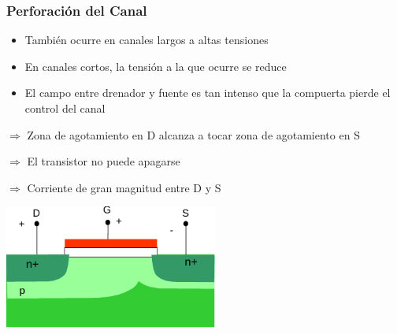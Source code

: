 \documentclass[t,aspectratio=169,10pt]{beamer}
\begin{document}
\begin{frame}
\frametitle{Perforación del Canal}
\begin{itemize}
	\item También ocurre en canales largos a altas tensiones
	\item En canales cortos, la tensión a la que ocurre se reduce
	\item El campo entre drenador y fuente es tan intenso que la compuerta pierde el control del canal
\end{itemize}

$\Rightarrow$ Zona de agotamiento en D alcanza a tocar zona de agotamiento en S

$\Rightarrow$ El transistor no puede apagarse

$\Rightarrow$ Corriente de gran magnitud entre D y S

\centering
\includegraphics[width=7cm]{channel-perf}
\end{frame}
\end{document}
